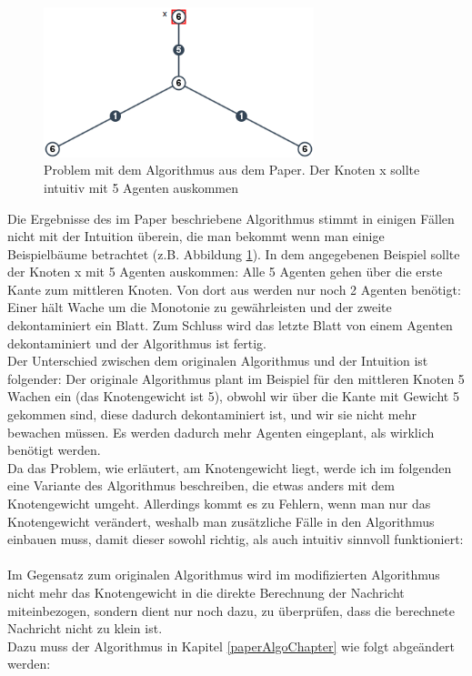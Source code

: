 	\begin{figure}
		\begin{center}
			\includegraphics[width=0.7\textwidth]{bilder/abb_paper_problem.png}
		\end{center}
		\caption{Problem mit dem Algorithmus aus dem Paper. Der Knoten x sollte intuitiv mit 5 Agenten auskommen}
		\label{fig:negBeispielPaperAlgo}
	\end{figure}

Die Ergebnisse des im Paper beschriebene Algorithmus stimmt in einigen Fällen nicht mit der Intuition überein, die man bekommt wenn man einige Beispielbäume betrachtet (z.B. Abbildung \ref{fig:negBeispielPaperAlgo}). In dem  angegebenen Beispiel sollte der Knoten x mit 5 Agenten auskommen: Alle 5 Agenten gehen über die erste Kante zum mittleren Knoten. Von dort aus werden nur noch 2 Agenten benötigt: Einer hält Wache um die Monotonie zu gewährleisten und der zweite dekontaminiert ein Blatt. Zum Schluss wird das letzte Blatt von einem Agenten dekontaminiert und der Algorithmus ist fertig.
\\
Der Unterschied zwischen dem originalen Algorithmus und der Intuition ist folgender: Der originale Algorithmus plant im Beispiel für den mittleren Knoten 5 Wachen ein (das Knotengewicht ist 5), obwohl wir über die Kante mit Gewicht 5 gekommen sind, diese dadurch dekontaminiert ist, und wir sie nicht mehr bewachen müssen. Es werden dadurch mehr Agenten eingeplant, als wirklich benötigt werden.
\\
Da das Problem, wie erläutert, am Knotengewicht liegt, werde ich im folgenden eine Variante des Algorithmus beschreiben, die etwas anders mit dem Knotengewicht umgeht. Allerdings kommt es zu Fehlern, wenn man nur das Knotengewicht verändert, weshalb man zusätzliche Fälle in den Algorithmus einbauen muss, damit dieser sowohl richtig, als auch intuitiv sinnvoll funktioniert:
\\
\\
Im Gegensatz zum originalen Algorithmus wird im modifizierten Algorithmus nicht mehr das Knotengewicht in die direkte Berechnung der Nachricht miteinbezogen, sondern dient nur noch dazu, zu überprüfen, dass die berechnete Nachricht nicht zu klein ist.
\\
Dazu muss der Algorithmus in Kapitel \ref{paperAlgoChapter} wie folgt abgeändert werden:

